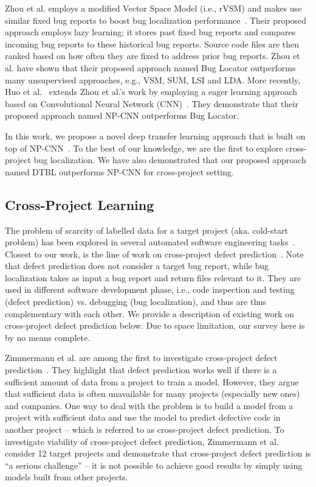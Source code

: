 \vspace{0.2cm} Zhou et al. employs a modified Vector Space Model (i.e., rVSM) and makes use similar fixed bug reports to boost bug localization performance~\cite{zhou2012should}. Their proposed approach employs lazy learning; it stores past fixed bug reports and compares incoming bug reports to these historical bug reports. Source code files are then ranked based on how often they are fixed to address prior bug reports. Zhou et al. have shown that their proposed approach named Bug Locator outperforms many unsupervised approaches, e.g., VSM, SUM, LSI and LDA. More recently, Huo et al.~\cite{huo2016learning} extends Zhou et al.'s work by employing a eager learning approach based on Convolutional Neural Network (CNN)~\cite{kim2014convolutional}. They demonstrate that their proposed approach named NP-CNN outperforms Bug Locator.

In this work, we propose a novel deep transfer learning approach that is built on top of NP-CNN~\cite{kim2014convolutional}. To the best of our knowledge, we are the first to explore cross-project bug localization. We have also demonstrated that our proposed approach named DTBL outperforms NP-CNN for cross-project setting.

\subsection{Cross-Project Learning}\label{sec.crossproj}

The problem of scarcity of labelled data for a target project (aka. cold-start problem) has been explored in several automated software engineering tasks~\cite{ZimmermannNGGM09,TurhanMBS09,NamPK13,KitchenhamMT07}. Closest to our work, is the line of work on cross-project defect prediction~\cite{ZimmermannNGGM09,TurhanMBS09,NamPK13}. Note that defect prediction does not consider a target bug report, while bug localization takes as input a bug report and return files relevant to it. They are used in different software development phase, i.e., code inspection and testing (defect prediction) vs. debugging (bug localization), and thus are thus complementary with each other. We provide a description of existing work on cross-project defect prediction below. Due to space limitation, our survey here is by no means complete.

Zimmermann et al. are among the first to investigate cross-project defect prediction~\cite{ZimmermannNGGM09}. They highlight that defect prediction works well if there is a sufficient amount of data from a project to train a model. However, they argue that sufficient data is often unavailable for many projects (especially new ones) and companies. One way to deal with the problem is to build a model from a project with sufficient data and use the model to predict defective code in another project -- which is referred to as cross-project defect prediction. To investigate viability of cross-project defect prediction, Zimmermann et al. consider 12 target projects and demonstrate that cross-project defect prediction is ``a serious challenge'' -- it is not possible to achieve good results by simply using models built from other projects. 

